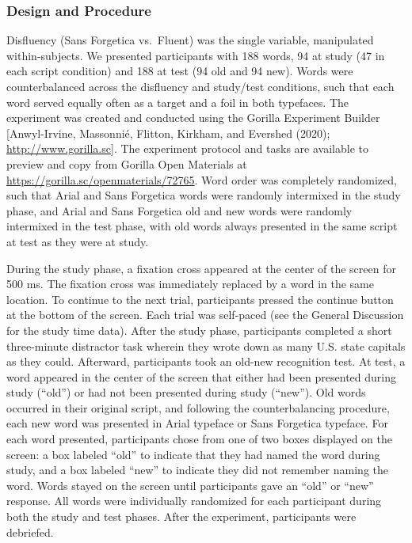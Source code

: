 \documentclass[
  english,
  jou]{apa6}
\begin{document}
\hypertarget{design-and-procedure-1}{%
\subsubsection{Design and Procedure}\label{design-and-procedure-1}}

Disfluency (Sans Forgetica vs.~Fluent) was the single variable, manipulated within-subjects. We presented participants with 188 words, 94 at study (47 in each script condition) and 188 at test (94 old and 94 new). Words were counterbalanced across the disfluency and study/test conditions, such that each word served equally often as a target and a foil in both typefaces. The experiment was created and conducted using the Gorilla Experiment Builder {[}Anwyl-Irvine, Massonnié, Flitton, Kirkham, and Evershed (2020); \url{http://www.gorilla.sc}{]}. The experiment protocol and tasks are available to preview and copy from Gorilla Open Materials at \url{https://gorilla.sc/openmaterials/72765}. Word order was completely randomized, such that Arial and Sans Forgetica words were randomly intermixed in the study phase, and Arial and Sans Forgetica old and new words were randomly intermixed in the test phase, with old words always presented in the same script at test as they were at study.

During the study phase, a fixation cross appeared at the center of the screen for 500 ms. The fixation cross was immediately replaced by a word in the same location. To continue to the next trial, participants pressed the continue button at the bottom of the screen. Each trial was self-paced (see the General Discussion for the study time data). After the study phase, participants completed a short three-minute distractor task wherein they wrote down as many U.S. state capitals as they could. Afterward, participants took an old-new recognition test. At test, a word appeared in the center of the screen that either had been presented during study (\enquote{old}) or had not been presented during study (\enquote{new}). Old words occurred in their original script, and following the counterbalancing procedure, each new word was presented in Arial typeface or Sans Forgetica typeface. For each word presented, participants chose from one of two boxes displayed on the screen: a box labeled \enquote{old} to indicate that they had named the word during study, and a box labeled \enquote{new} to indicate they did not remember naming the word. Words stayed on the screen until participants gave an \enquote{old} or \enquote{new} response. All words were individually randomized for each participant during both the study and test phases. After the experiment, participants were debriefed.
\end{document}
